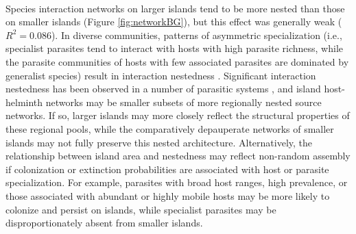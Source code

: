 \paragraph*{} Species interaction networks on larger islands tend to be more nested than those on smaller islands (Figure \ref{fig:networkBG}), but this effect was generally weak ($R^2 = $0.086). In diverse communities, patterns of asymmetric specialization (i.e., specialist parasites tend to interact with hosts with high parasite richness, while the parasite communities of hosts with few associated parasites are dominated by generalist species) result in interaction nestedness \parencite{vazquez2005species, lima2012patterns}. Significant interaction nestedness has been observed in a number of parasitic systems \parencite{krasnov2011nestedness, lima2012patterns, guerra2016host}, and island host-helminth networks may be smaller subsets of more regionally nested source networks. If so, larger islands may more closely reflect the structural properties of these regional pools, while the comparatively depauperate networks of smaller islands may not fully preserve this nested architecture. Alternatively, the relationship between island area and nestedness may reflect non-random assembly if colonization or extinction probabilities are associated with host or parasite specialization. For example, parasites with broad host ranges, high prevalence, or those associated with abundant or highly mobile hosts may be more likely to colonize and persist on islands, while specialist parasites may be disproportionately absent from smaller islands.  

